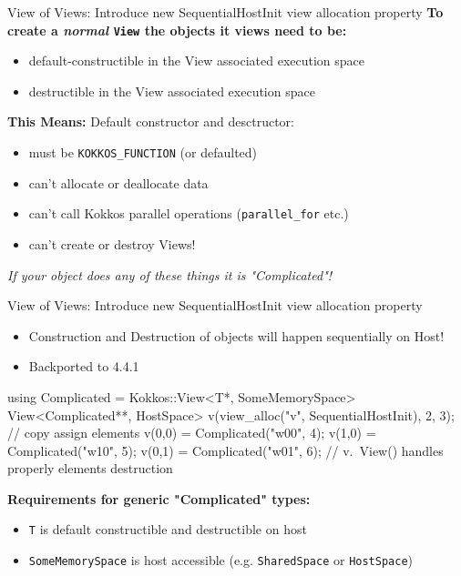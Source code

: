 \begin{frame}[fragile]{View of Views: Introduce new SequentialHostInit view allocation property}
\textbf{To create a \textit{normal} \texttt{View} the objects it views need to be:}
\begin{itemize}
  \item default-constructible in the View associated execution space
  \item destructible in the View associated execution space 
\end{itemize}

\vspace{10pt}

\textbf{This Means:} Default constructor and desctructor:
\begin{itemize}
\item{must be \texttt{KOKKOS\_FUNCTION} (or defaulted)}
\item{can't allocate or deallocate data}
\item{can't call Kokkos parallel operations (\texttt{parallel\_for} etc.)}
\item{can't create or destroy Views!}
\end{itemize}

\vspace{10pt}
\begin{center}
\textit{If your object does any of these things it is "Complicated"!}
\end{center}

\end{frame}


\begin{frame}[fragile]{View of Views: Introduce new SequentialHostInit view allocation property}

\begin{itemize}
\item Construction and Destruction of objects will happen sequentially on Host!
\item Backported to 4.4.1
\end{itemize}

\begin{code}
using Complicated = Kokkos::View<T*, SomeMemorySpace>
View<Complicated**, HostSpace> v(view_alloc("v", SequentialHostInit), 2, 3);
// copy assign elements
v(0,0) = Complicated("w00", 4);
v(1,0) = Complicated("w10", 5);
v(0,1) = Complicated("w01", 6);
// v.~View() handles properly elements destruction
\end{code}

\vspace{10pt}
\textbf{Requirements for generic "Complicated" types:}
\begin{itemize}
\item \texttt{T} is default constructible and destructible on host
\item \texttt{SomeMemorySpace} is host accessible (e.g. \texttt{SharedSpace} or \texttt{HostSpace})
\end{itemize}
\end{frame}

